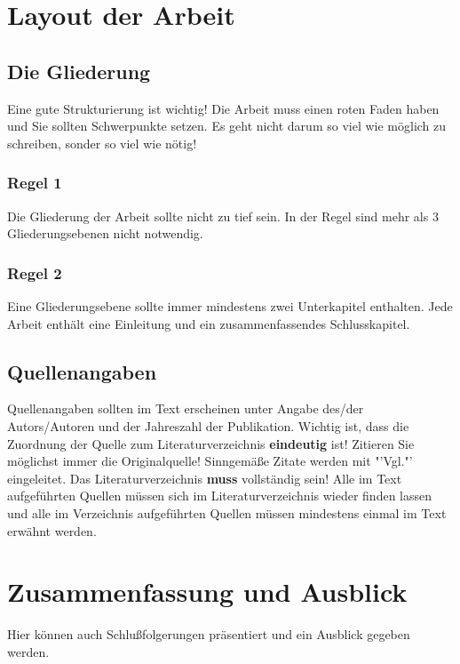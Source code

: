 \documentclass[12pt]{article}
\begin{document}
\section{Layout der Arbeit}

\subsection{Die Gliederung}

Eine gute Strukturierung ist wichtig! Die Arbeit muss einen roten Faden haben und Sie sollten Schwerpunkte setzen. Es geht nicht darum so viel wie möglich zu schreiben, sonder so viel wie nötig!

\subsubsection{Regel 1}
Die Gliederung der Arbeit sollte nicht zu tief sein. In der Regel sind mehr als 3 Gliederungsebenen nicht notwendig.

\subsubsection{Regel 2}
Eine Gliederungsebene sollte immer mindestens zwei Unterkapitel enthalten. Jede Arbeit enthält eine Einleitung und ein zusammenfassendes Schlusskapitel.

\subsection{Quellenangaben}
Quellenangaben sollten im Text erscheinen unter Angabe des/der Autors/Autoren und der Jahreszahl der Publikation. Wichtig ist, dass die Zuordnung der Quelle zum Literaturverzeichnis \textbf{eindeutig} ist! Zitieren Sie möglichst immer die Originalquelle! Sinngemäße Zitate werden mit "'Vgl."' eingeleitet. Das Literaturverzeichnis \textbf{muss} vollständig sein! Alle im Text aufgeführten Quellen müssen sich im Literaturverzeichnis wieder finden lassen und alle im Verzeichnis aufgeführten Quellen müssen mindestens einmal im Text erwähnt werden.

\section{Zusammenfassung und Ausblick}%

Hier können auch Schlußfolgerungen präsentiert und ein Ausblick gegeben werden.
\end{document}
